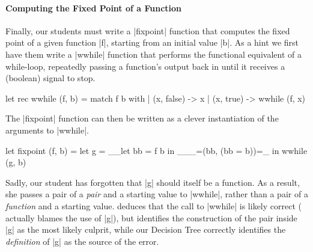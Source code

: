 \paragraph{Computing the Fixed Point of a Function}
Finally, our students must write a |fixpoint| function that computes the
fixed point of a given function |f|, starting from an initial value |b|.
%
As a hint we first have them write a |wwhile| function that performs the
functional equivalent of a while-loop, repeatedly passing a function's
output back in until it receives a (boolean) signal to stop.
%
\begin{ecode}
  let rec wwhile (f, b) =
    match f b with
    | (x, false) -> x
    | (x, true)  -> wwhile (f, x)
\end{ecode}
\lstset{firstnumber=last}
%
The |fixpoint| function can then be written as a clever instantiation of
the arguments to |wwhile|.
%
\begin{ecode}
  let fixpoint (f, b) =
    let g = __let bb = f b in ___=(bb, (bb = b))=_ in
    wwhile (g, b)
\end{ecode}
\lstset{firstnumber=1}
%
Sadly, our student has forgotten that |g| should itself be a function.
%
As a result, she passes a pair of a \emph{pair} and a starting value to
|wwhile|, rather than a pair of a \emph{function} and a starting value.
%
\sherrloc deduces that the call to |wwhile| is likely correct (\ocaml
actually blames the use of |g|), but identifies the construction of the
pair inside |g| as the most likely culprit, while our Decision Tree
correctly identifies the \emph{definition} of |g| as the source of the
error.

